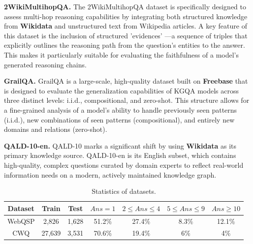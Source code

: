 \textbf{2WikiMultihopQA.}
The 2WikiMultihopQA dataset is specifically designed to assess multi-hop reasoning capabilities by integrating both structured knowledge from \textbf{Wikidata} and unstructured text from Wikipedia articles. A key feature of this dataset is the inclusion of structured 'evidences' —a sequence of triples that explicitly outlines the reasoning path from the question's entities to the answer. This makes it particularly suitable for evaluating the faithfulness of a model's generated reasoning chains.



\textbf{GrailQA.}
GrailQA is a large-scale, high-quality dataset built on \textbf{Freebase} that is designed to evaluate the generalization capabilities of KGQA models across three distinct levels: i.i.d., compositional, and zero-shot. This structure allows for a fine-grained analysis of a model's ability to handle previously seen patterns (i.i.d.), new combinations of seen patterns (compositional), and entirely new domains and relations (zero-shot).



\textbf{QALD-10-en.}
QALD-10 marks a significant shift by using \textbf{Wikidata} as its primary knowledge source. QALD-10-en is its English subset, which contains high-quality, complex questions curated by domain experts to reflect real-world information needs on a modern, actively maintained knowledge graph.

\begin{table}[h!]
\centering
\caption{Statistics of datasets.}
\label{tab:webqsp_stats}
\begin{tabular}{@{}ccc|cccc@{}}
\toprule
Dataset & Train & Test & $Ans=1$ & $2\leq Ans\leq 4$ & $5\leq Ans\leq 9$ &  $Ans\geq 10$ \\ \midrule
WebQSP & 2,826 & 1,628 & 51.2\% & 27.4\% &8.3\% &12.1\%\\ 
CWQ & 27,639 & 3,531 & 70.6\% & 19.4\% & 6\% & 4\% \\
\bottomrule
\end{tabular}
\end{table}

